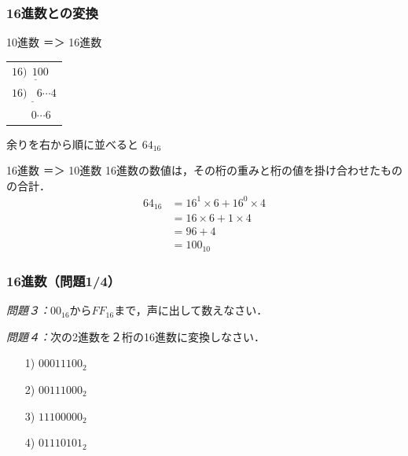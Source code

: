 \documentclass[handout]{beamer}        %
\begin{document}
\begin{frame}
  \frametitle{16進数との変換}

  \begin{itembox}[l]{10進数 ＝＞ 16進数}
    \begin{minipage}{0.3\columnwidth}
      \begin{flushright}
        \begin{tabular}{l}
          $16 \underline{) ~~100 } $\\
          $16 \underline{) ~~~~6 } {\cdots 4}$ \\
          $~~~            ~~~~~0   {\cdots 6}$
        \end{tabular}
      \end{flushright}
    \end{minipage}
    \begin{minipage}{0.5\columnwidth}
      余りを右から順に並べると $64_{16}$
    \end{minipage}
  \end{itembox}

  \begin{itembox}[l]{16進数 ＝＞ 10進数}
    16進数の数値は，その桁の重みと桁の値を掛け合わせたものの合計．
    \begin{align*}
      64_{16} &= 16^1 \times 6 + 16^0 \times 4 \\
      &= 16 \times 6 + 1 \times 4 \\
      &= 96 + 4 \\
      &= 100_{10}
    \end{align*}
  \end{itembox}
\end{frame}

\begin{frame}
  \frametitle{16進数（問題1/4）}
\emph{問題３：}$00_{16}$から$FF_{16}$まで，声に出して数えなさい．


\emph{問題４：}次の2進数を２桁の16進数に変換しなさい．
\begin{enumerate}
\item[1)] $0001 1100_2$
\vfill
\item[2)] $0011 1000_2$
\vfill
\item[3)] $1110 0000_2$
\vfill
\item[4)] $0111 0101_2$
\vfill
\end{enumerate}
\vfill
\end{frame}
\end{document}

